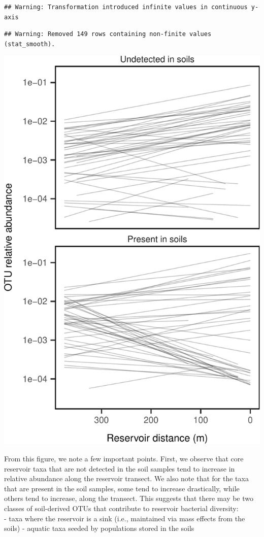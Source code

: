 \documentclass[]{article}
\begin{document}
\begin{verbatim}
## Warning: Transformation introduced infinite values in continuous y-axis
\end{verbatim}

\begin{verbatim}
## Warning: Removed 149 rows containing non-finite values (stat_smooth).
\end{verbatim}

\begin{center}\includegraphics{ReservoirGradient_files/figure-latex/coreplot-1} \end{center}

From this figure, we note a few important points. First, we observe that
core reservoir taxa that are not detected in the soil samples tend to
increase in relative abundance along the reservoir transect. We also
note that for the taxa that are present in the soil samples, some tend
to increase drastically, while others tend to increase, along the
transect. This suggests that there may be two classes of soil-derived
OTUs that contribute to reservoir bacterial diversity:\\
- taxa where the reservoir is a sink (i.e., maintained via mass effects
from the soils) - aquatic taxa seeded by populations stored in the soils
\end{document}
